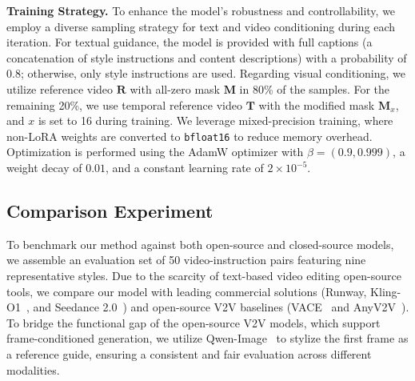 \documentclass[runningheads]{llncs}
\begin{document}
\textbf{Training Strategy.} 
To enhance the model's robustness and controllability, we employ a diverse sampling strategy for text and video conditioning during each iteration. For textual guidance, the model is provided with full captions (a concatenation of style instructions and content descriptions) with a probability of 0.8; otherwise, only style instructions are used. 
Regarding visual conditioning, we utilize reference video $\mathbf{R}$ with all-zero mask $\mathbf{M}$ in 80\% of the samples. For the remaining 20\%, we use temporal reference video $\mathbf{T}$ with the modified mask $\mathbf{M}_x$, and $x$ is set to 16 during training. 
We leverage mixed-precision training, where non-LoRA weights are converted to \texttt{bfloat16} to reduce memory overhead. Optimization is performed using the AdamW optimizer with $\beta=(0.9, 0.999)$, a weight decay of $0.01$, and a constant learning rate of $2 \times 10^{-5}$.
\subsection{Comparison Experiment}
To benchmark our method against both open-source and closed-source models, we assemble an evaluation set of 50 video-instruction pairs featuring nine representative styles. Due to the scarcity of text-based video editing open-source tools, we compare our model with leading commercial solutions (Runway, Kling-O1~\cite{Kling-O1}, and Seedance 2.0~\cite{seedance2.0}) and open-source V2V baselines (VACE~\cite{jiang2025vace} and AnyV2V~\cite{kuanyv2v}). To bridge the functional gap of the open-source V2V models, which support frame-conditioned generation, we utilize Qwen-Image~\cite{qwenimage} to stylize the first frame as a reference guide, ensuring a consistent and fair evaluation across different modalities.

\end{document}
